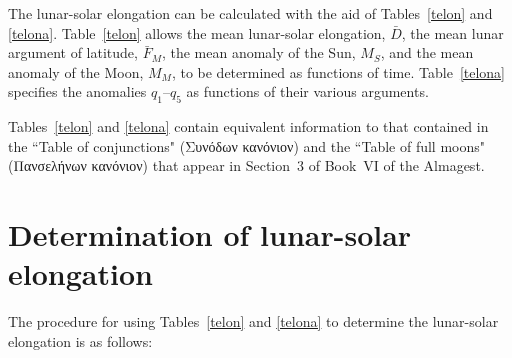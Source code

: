 The lunar-solar elongation can be calculated with the aid of Tables~\ref{telon} and \ref{telona}.
Table~\ref{telon} allows the mean lunar-solar elongation, $\bar{D}$, the mean lunar
argument of latitude, $\bar{F}_M$, the mean anomaly of the Sun, $M_S$,
and the mean anomaly of the Moon, $M_M$, to be determined as functions of time.
Table~\ref{telona} specifies the anomalies $q_1$--$q_5$ as functions of their
various arguments.

Tables~\ref{telon} and \ref{telona} contain equivalent information to that contained in the ``Table of conjunctions" (Συνόδων κανόνιον) and the ``Table of full moons" (Πανσελήνων κανόνιον)
that appear in Section~3 of Book~VI of the Almagest.

\section{Determination of lunar-solar elongation}\label{sxxc}
The procedure for using Tables~\ref{telon} and \ref{telona}  to determine the lunar-solar elongation is as follows:

